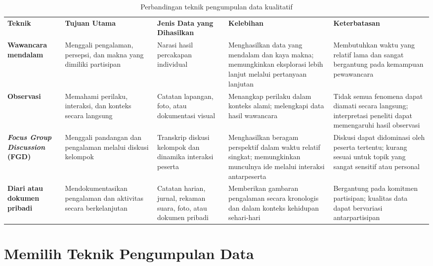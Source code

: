 \documentclass[
  indonesian,
  letterpaper,
  DIV=11,
  numbers=noendperiod]{scrreprt}
\begin{document}
\begin{longtable}[]{@{}
  >{\raggedright\arraybackslash}p{}
  >{\raggedright\arraybackslash}p{}
  >{\raggedright\arraybackslash}p{}
  >{\raggedright\arraybackslash}p{}
  >{\raggedright\arraybackslash}p{}@{}}
\caption{Perbandingan teknik pengumpulan data
kualitatif}\label{tbl-teknikkuali}\tabularnewline
\toprule\noalign{}
\endfirsthead
\endhead
\bottomrule\noalign{}
\endlastfoot
\textbf{Teknik} & \textbf{Tujuan Utama} & \textbf{Jenis Data yang
Dihasilkan} & \textbf{Kelebihan} & \textbf{Keterbatasan} \\
\textbf{Wawancara mendalam} & Menggali pengalaman, persepsi, dan makna
yang dimiliki partisipan & Narasi hasil percakapan individual &
Menghasilkan data yang mendalam dan kaya makna; memungkinkan eksplorasi
lebih lanjut melalui pertanyaan lanjutan & Membutuhkan waktu yang
relatif lama dan sangat bergantung pada kemampuan pewawancara \\
\textbf{Observasi} & Memahami perilaku, interaksi, dan konteks secara
langsung & Catatan lapangan, foto, atau dokumentasi visual & Menangkap
perilaku dalam konteks alami; melengkapi data hasil wawancara & Tidak
semua fenomena dapat diamati secara langsung; interpretasi peneliti
dapat memengaruhi hasil observasi \\
\textbf{\emph{Focus Group Discussion}} \textbf{(FGD)} & Menggali
pandangan dan pengalaman melalui diskusi kelompok & Transkrip diskusi
kelompok dan dinamika interaksi peserta & Menghasilkan beragam
perspektif dalam waktu relatif singkat; memungkinkan munculnya ide
melalui interaksi antarpeserta & Diskusi dapat didominasi oleh peserta
tertentu; kurang sesuai untuk topik yang sangat sensitif atau
personal \\
\textbf{Diari atau dokumen pribadi} & Mendokumentasikan pengalaman dan
aktivitas secara berkelanjutan & Catatan harian, jurnal, rekaman suara,
foto, atau dokumen pribadi & Memberikan gambaran pengalaman secara
kronologis dan dalam konteks kehidupan sehari-hari & Bergantung pada
komitmen partisipan; kualitas data dapat bervariasi antarpartisipan \\
\end{longtable}

\section{Memilih Teknik Pengumpulan
Data}\label{memilih-teknik-pengumpulan-data}
\end{document}
